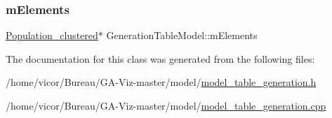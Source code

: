 \subsubsection{\texorpdfstring{m\+Elements}{mElements}}
{\footnotesize\ttfamily \hyperlink{class_population__clustered}{Population\+\_\+clustered}$\ast$ Generation\+Table\+Model\+::m\+Elements}



The documentation for this class was generated from the following files\+:\begin{DoxyCompactItemize}
\item 
/home/vicor/\+Bureau/\+G\+A-\/\+Viz-\/master/model/\hyperlink{model__table__generation_8h}{model\+\_\+table\+\_\+generation.\+h}\item 
/home/vicor/\+Bureau/\+G\+A-\/\+Viz-\/master/model/\hyperlink{model__table__generation_8cpp}{model\+\_\+table\+\_\+generation.\+cpp}\end{DoxyCompactItemize}
